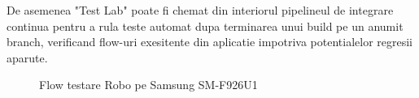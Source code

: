 De asemenea "Test Lab" poate fi chemat din interiorul pipelineul de integrare continua pentru a rula teste automat dupa terminarea unui build pe un anumit branch, verificand flow-uri exesitente din aplicatie impotriva potentialelor regresii aparute.

\begin{figure}[h!]
  \centering
  \caption{Flow testare Robo pe Samsung SM-F926U1}
\end{figure}